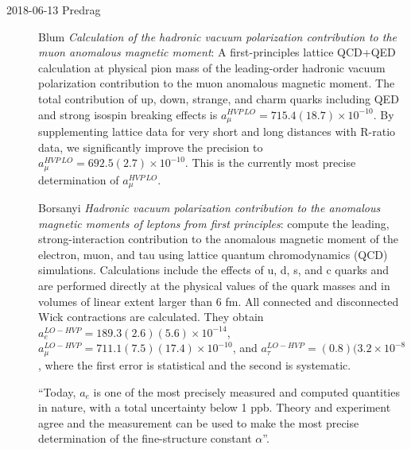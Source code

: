 \begin{description}
\item[2018-06-13 Predrag]
Blum \etal{}
{\em Calculation of the hadronic vacuum polarization contribution to the
muon anomalous magnetic moment}:
A first-principles lattice QCD+QED calculation at physical pion mass of
the leading-order hadronic vacuum polarization contribution to the muon
anomalous magnetic moment. The total contribution of up, down, strange,
and charm quarks including QED and strong isospin breaking effects is
$a^{HVP\,LO}_\mu=715.4(18.7) \times 10^{-10}$. By supplementing lattice
data for very short and long distances with R-ratio data, we
significantly improve the precision to $a^{HVP\,LO}_\mu=692.5(2.7) \times
10^{-10}$. This is the currently most precise determination of
$a^{HVP\,LO}_\mu$.

Borsanyi \etal{} {\em Hadronic vacuum polarization
contribution to the anomalous magnetic moments of leptons from first
principles}:
compute the leading, strong-interaction contribution to the anomalous
magnetic moment of the electron, muon, and tau using lattice quantum
chromodynamics (QCD) simulations. Calculations include the effects of u,
d, s, and c quarks and are performed directly at the physical values of
the quark masses and in volumes of linear extent larger than 6 fm. All
connected and disconnected Wick contractions are calculated. They obtain
$a^{LO-HVP}_e=189.3(2.6)(5.6) \times 10^{-14}$,
$a^{LO-HVP}_\mu=711.1(7.5)(17.4) \times 10^{-10}$, and
$a^{LO-HVP}_\tau=(0.8)(3.2 \times 10^{-8}$,
where the first error is statistical and the second is systematic.

``Today, $a_e$ is one of the most precisely measured and
computed quantities in
nature, with a total uncertainty below 1 ppb. Theory and experiment agree
and the measurement can be used to make the most precise
determination of the fine-structure constant $\alpha$''.


\end{description}
